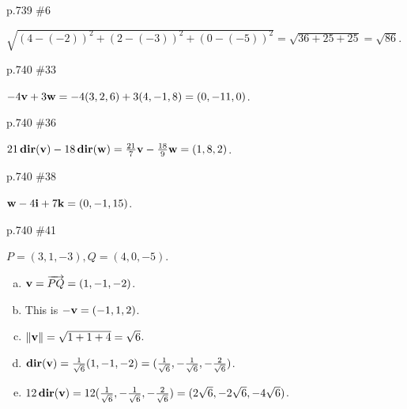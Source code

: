 \begin{practice}p.739 \#6\end{practice}
\begin{pracsol}
  $\sqrt{(4-(-2))^2+(2-(-3))^2+(0-(-5))^2}=\sqrt{36+25+25}=\sqrt{86}$.
\end{pracsol}
\begin{practice}p.740 \#33\end{practice}
\begin{pracsol}
  $-4\mathbf v+3\mathbf w=-4(3,2,6)+3(4,-1,8)=(0,-11,0)$.
\end{pracsol}
\begin{practice}p.740 \#36\end{practice}
\begin{pracsol}
  $21\operatorname{\mathbf{dir}}(\mathbf v)-18\operatorname{\mathbf{dir}}(\mathbf w)=\frac{21}7\mathbf v-\frac{18}{9}\mathbf w=(1,8,2)$.
\end{pracsol}
\begin{practice}p.740 \#38\end{practice}
\begin{pracsol}
  $\mathbf w-4\mathbf i+7\mathbf k=(0,-1,15)$.
\end{pracsol}
\begin{practice}p.740 \#41\end{practice}
\begin{pracsol}
  $P=(3,1,-3), Q=(4,0,-5)$.
  \begin{enumerate}[(a)]
    \item $\mathbf v=\overrightarrow{PQ}=(1,-1,-2)$.
    \item This is $-\mathbf v=(-1,1,2)$.
    \item $\|\mathbf v\|=\sqrt{1+1+4}=\sqrt 6$.
    \item $\operatorname{\mathbf{dir}}(\mathbf v)=\frac1{\sqrt6}(1,-1,-2)=(\frac1{\sqrt6},-\frac1{\sqrt6},-\frac2{\sqrt6})$.
    \item $12\operatorname{\mathbf{dir}}(\mathbf v)=12(\frac1{\sqrt6},-\frac1{\sqrt6},-\frac2{\sqrt6})=(2\sqrt6,-2\sqrt6,-4\sqrt6)$.
  \end{enumerate}
\end{pracsol}
